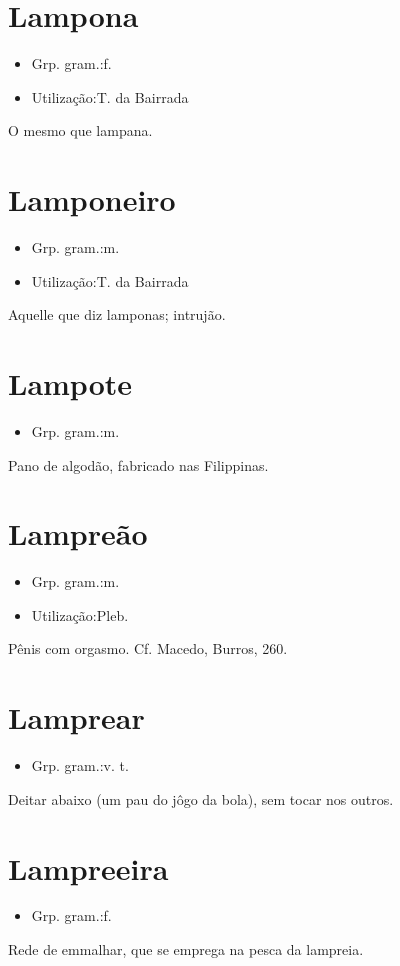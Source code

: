 \section{Lampona}
\begin{itemize}
\item {Grp. gram.:f.}
\end{itemize}
\begin{itemize}
\item {Utilização:T. da Bairrada}
\end{itemize}
O mesmo que \textunderscore lampana\textunderscore .
\section{Lamponeiro}
\begin{itemize}
\item {Grp. gram.:m.}
\end{itemize}
\begin{itemize}
\item {Utilização:T. da Bairrada}
\end{itemize}
Aquelle que diz lamponas; intrujão.
\section{Lampote}
\begin{itemize}
\item {Grp. gram.:m.}
\end{itemize}
Pano de algodão, fabricado nas Filippinas.
\section{Lampreão}
\begin{itemize}
\item {Grp. gram.:m.}
\end{itemize}
\begin{itemize}
\item {Utilização:Pleb.}
\end{itemize}
Pênis com orgasmo. Cf. Macedo, \textunderscore Burros\textunderscore , 260.
\section{Lamprear}
\begin{itemize}
\item {Grp. gram.:v. t.}
\end{itemize}
Deitar abaixo (um pau do jôgo da bola), sem tocar nos outros.
\section{Lampreeira}
\begin{itemize}
\item {Grp. gram.:f.}
\end{itemize}
Rede de emmalhar, que se emprega na pesca da lampreia.
